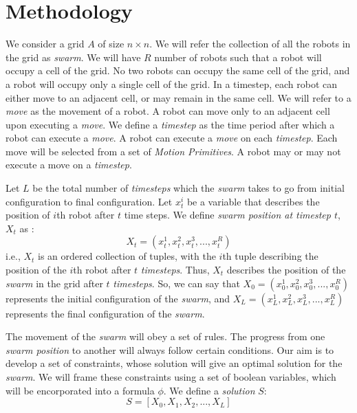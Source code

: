 \documentclass{article}[11pt]
\begin{document}
	\section{Methodology}
		We consider a grid $A$ of size $n \times n$.
		We will refer the collection of all the robots in the grid as \textit{swarm}. 
		We will have $R$ number of robots such that a robot will occupy a cell of the grid.
		No two robots can occupy the same cell of the grid, and a robot will occupy only a single cell of the grid.
		In a timestep, each robot can either move to an adjacent cell, or may remain in the same cell.
		We will refer to a \textit{move} as the movement of a robot.
		A robot can move only to an adjacent cell upon executing a \textit{move}.
		We define a \textit{timestep} as the time period after which a robot can execute a \textit{move}.
		A robot can execute a \textit{move} on each \textit{timestep}.
		Each move will be selected from a set of \textit{Motion Primitives}. 
		A robot may or may not execute a move on a \textit{timestep}.

		Let $L$ be the total number of \textit{timesteps} which the \textit{swarm} takes to go from initial configuration to final configuration.  
		Let $x_t^i$ be a variable that describes the position of $i$th robot after $t$ time steps.
		We define \textit{swarm position at timestep $t$}, $X_t$ as :
		$$
			X_t = (x_t^1, x_t^2, x_t^3, . . . , x_t^R)
		$$
		i.e., $X_t$ is an ordered collection of tuples, with the $i$th tuple describing the position of the $i$th robot after $t$ \textit{timesteps}.
		Thus, $X_t$ describes the position of the \textit{swarm} in the grid after $t$ \textit{timesteps}. So, we can say that $X_0 =(x_0^1, x_0^2, x_0^3, . . . , x_0^R)$ represents the initial configuration of the \textit{swarm}, and $X_L = (x_L^1, x_L^2, x_L^3, . . . , x_L^R)$ represents the final configuration of the \textit{swarm}.

		The movement of the \textit{swarm} will obey a set of rules. The progress from one \textit{swarm position} to another will always follow certain conditions.
		Our aim is to develop a set of constraints, whose solution will give an optimal solution for the \textit{swarm}.
		We will frame these constraints using a set of boolean variables, which will be encorporated into a formula $\phi$.
		We define a \textit{solution} $S$:
		$$
			S = [X_0, X_1, X_2, . . . , X_L]  
		$$
\end{document}
